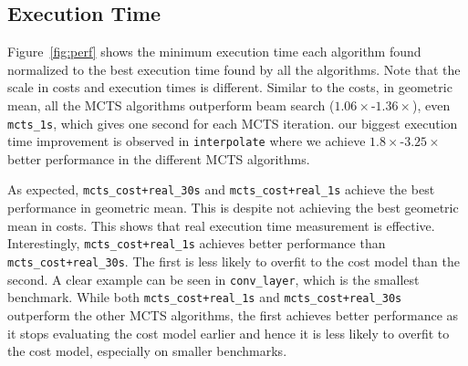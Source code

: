 \subsection{Execution Time}
Figure~\ref{fig:perf} shows the minimum execution time each algorithm found normalized to the best execution time found by all the algorithms. Note that the scale in costs and execution times is different.  Similar to the costs, in geometric mean, all the MCTS algorithms outperform beam search ($1.06\times$-$1.36\times$), even \texttt{mcts\_1s}, which gives one second for each MCTS iteration. our biggest execution time improvement is observed in \texttt{interpolate} where we achieve $1.8\times$-$3.25\times$ better performance in the different MCTS algorithms. 

As expected,  \texttt{mcts\_cost+real\_30s} and \texttt{mcts\_cost+real\_1s} achieve the best performance in geometric mean. This is despite not achieving the best geometric mean in costs. This shows that real execution time measurement is effective. Interestingly, \texttt{mcts\_cost+real\_1s} achieves better performance than \texttt{mcts\_cost+real\_30s}. The first is less likely to overfit to the cost model than the second. A clear example can be seen in \texttt{conv\_layer}, which is the smallest benchmark. While both \texttt{mcts\_cost+real\_1s} and \texttt{mcts\_cost+real\_30s} outperform the other MCTS algorithms, the first achieves better performance as it stops evaluating the cost model earlier and hence it is less likely to overfit to the cost model, especially on smaller benchmarks.



